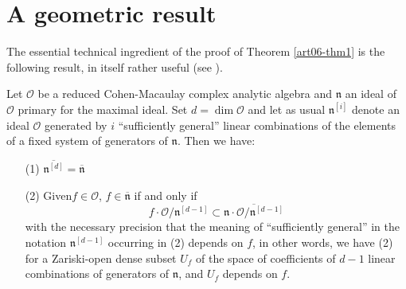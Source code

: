 \section{A geometric result}\label{art06-sec1}
The essential technical ingredient of the proof of Theorem \ref{art06-thm1} is the following result, in itself rather useful (see \cite{art06-keyT}).

\begin{prop*}
Let $\mathcal{O}$ be a reduced Cohen-Macaulay complex analytic algebra and $\mathfrak{n}$ an ideal of $\mathcal{O}$ primary for the maximal ideal. Set $d = \dim \mathcal{O}$ and let as usual $\mathfrak{n}^{[i]}$ denote an ideal $\mathcal{O}$ generated by $i$ ``sufficiently general'' linear combinations of the elements of a fixed system of generators of $\mathfrak{n}$. Then we have:
\begin{itemize}
\item[{\rm(1)}] $\overline{\mathfrak{n}^{[d]}} = \overline{\mathfrak{n}}$ 

\item[{\rm(2)}] Given\pageoriginale $f \in \mathcal{O}$, $f \in \overline{\mathfrak{n}}$ if and only if 
$$
f \cdot \mathcal{O} / \mathfrak{n}^{[d-1]} \subset \overline{\mathfrak{n} \cdot \mathcal{O}/\mathfrak{n}^{[d-1]}}
$$
with the necessary precision that the meaning of ``sufficiently general'' in the notation $\mathfrak{n}^{[d-1]}$ occurring in (2) depends on $f$, in other words, we have (2) for a Zariski-open dense subset $U_f$ of the space of coefficients of $d-1$ linear combinations of generators of $\mathfrak{n}$, and $U_f$ depends on $f$.
\end{itemize}
\end{prop*}

